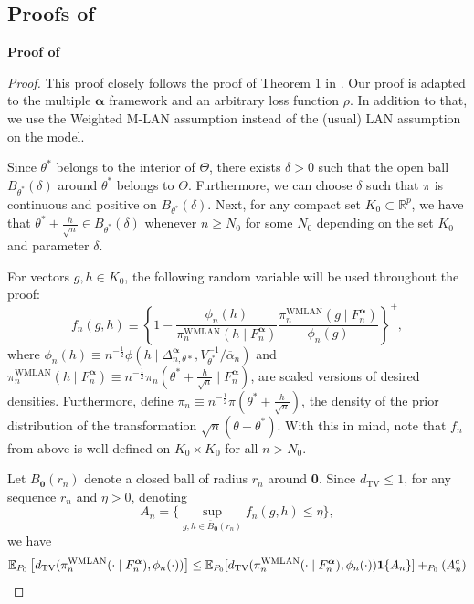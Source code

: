 \documentclass[11pt, oneside]{amsart}
\theoremstyle{definition}   %
\let\P\relax
\newcommand{\P}{\mathbb{P}}
\newcommand{\E}{\mathbb{E}}
\newcommand{\loss}{\rho}
\newcommand{\wempirical}{F_n^{\boldsymbol{\alpha}}}
\begin{document}
\subsection[Proofs of Sec. Asymptotics]{Proofs of }
\noindent \textbf{Proof of }

\begin{proof}
    This proof closely follows the proof of Theorem 1 in \cite{avellamedinaetal2021}. Our proof is adapted to the multiple $\mathbf{\alpha}$ framework and an arbitrary loss function \( \loss \). In addition to that, we use the Weighted M-LAN assumption instead of the (usual) LAN assumption on the model.

    Since $\theta^*$ belongs to the interior of $\Theta$, there exists $\delta > 0$ such that the open ball $B_{\theta^*}(\delta)$ around $\theta^*$ belongs to $\Theta$. Furthermore, we can choose $\delta$ such that $\pi$ is continuous and positive on $B_{\theta^*}(\delta)$.
    Next, for any compact set $K_0 \subset \mathbb{R}^p$, we have that $\theta^* + \frac{h}{\sqrt{n}} \in B_{\theta^*}(\delta)$ whenever $n \geq N_0$ for some $N_0$ depending on the set $K_0$ and parameter $\delta$.
    
    For vectors $g, h \in K_0$, the following random variable will be used throughout the proof:
    \begin{equation}
    \label{eq::BvM-def-of-fn}
        f_n(g,h) \equiv \left \{ 1 - \frac{\phi_n(h)}{\pi^{\mathrm{\mathrm{WMLAN}}}_{n}(h \mid \wempirical)} \frac{\pi^{\mathrm{\mathrm{WMLAN}}}_{n}(g \mid \wempirical)}{\phi_n(g)}\right \} ^ +,
    \end{equation}
    where $\phi_n(h) \equiv n ^ {- \frac{1}{2}} \phi (h \mid \Delta^{\boldsymbol{\alpha}}_{n, \theta*}, V_{\theta^*}^{-1} / \overline{\alpha}_n)$ 
    and
    $\pi^{\mathrm{WMLAN}}_{n}(h \mid \wempirical) \equiv n ^ {- \frac{1}{2}} \pi_{n}(\theta ^ * + \frac{h}{\sqrt{n}} \mid \wempirical)$,
    are scaled versions of desired densities. Furthermore, define 
    $\pi_n \equiv n ^ {- \frac{1}{2}} \pi (\theta ^ * + \frac{h}{\sqrt{n}})$,
    the density of the prior distribution of the transformation $\sqrt{n}(\theta - \theta ^ *)$.
    With this in mind, note that $f_n$ from above is well defined on $K_0 \times K_0$ for all $n > N_0$.
    
    Let $\overline{B}_{\textbf{0}}(r_n)$ denote a closed ball of radius $r_n$ around \textbf{0}. Since $d_{\mathrm{TV}} \leq 1$, for any sequence $r_n$ and $\eta > 0$, denoting 
    \[
    A_n = \Big \{ \underset{g,h \in \overline{B}_{\textbf{0}}(r_n) }{\sup} f_n(g, h) \leq \eta \Big \},
    \]
    we have
    \begin{equation}
    \label{eqn::BvM-proof-upper-bound-on-TV}
        \E_{P_0} \left [ d_{\mathrm{TV}} (\pi^{\mathrm{WMLAN}}_{n}(\cdot \mid \wempirical), \phi_n(\cdot) ) \right ]
        \leq \E_{P_0} [ d_{\mathrm{TV}} (\pi^{\mathrm{WMLAN}}_{n}(\cdot \mid \wempirical), \phi_n(\cdot) ) \mathbf{1} \{ A_n \} ] 
        + \P_{P_0} (A_n^c)
    \end{equation}
    

\end{proof}
\end{document}
